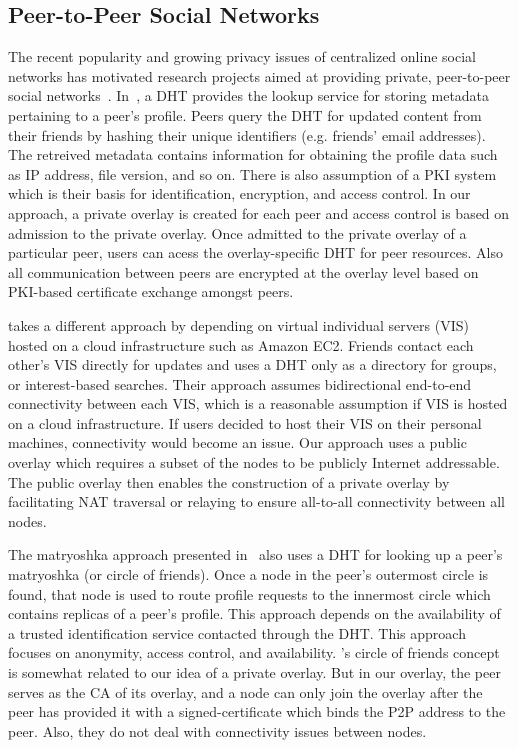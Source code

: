 \documentclass[letterpaper,twocolumn,10pt]{article}
\begin{document}
\subsection{Peer-to-Peer Social Networks}
The recent popularity and growing privacy issues of centralized online social networks 
has motivated research projects aimed at providing private, peer-to-peer
social networks~\cite{peerson, matryoshkas, tribler-osn, vis-a-vis}.
In~\cite{peerson}, a DHT provides the lookup service for storing metadata 
pertaining to a peer's profile. Peers query the DHT for updated content from 
their friends by hashing their unique identifiers (e.g. friends' email addresses). 
The retreived metadata contains information for obtaining the profile data such as
IP address, file version, and so on. There is also assumption of a PKI system which
is their basis for identification, encryption, and access control. In our
approach, a private overlay is created for each peer and access control is
based on admission to the private overlay. Once admitted to the private
overlay of a particular peer, users can acess the overlay-specific DHT for 
peer resources. Also all communication between peers are encrypted at the
overlay level based on PKI-based certificate exchange amongst peers.

\cite{vis-a-vis} takes a different approach by depending on virtual individual
servers (VIS) hosted on a cloud infrastructure such as Amazon EC2. Friends contact
each other's VIS directly for updates and uses a DHT only as a directory for
groups, or interest-based searches. Their approach assumes bidirectional
end-to-end connectivity between each VIS, which is a reasonable assumption if VIS 
is hosted on a cloud infrastructure. If users decided to host their VIS on their personal
machines, connectivity would become an issue. Our approach uses a public overlay
which requires a subset of the nodes to be publicly Internet addressable. The
public overlay then enables the construction of a private overlay by facilitating
NAT traversal or relaying to ensure all-to-all connectivity between all nodes.

The matryoshka approach presented in~\cite{matryoshka} also uses a DHT for
looking up a peer's matryoshka (or circle of friends). Once a node in the 
peer's outermost circle is found, that node is used to route profile requests to 
the innermost circle which contains replicas of a peer's profile. This
approach depends on the availability of a trusted identification service
contacted through the DHT. This approach focuses on anonymity, access control,
and availability. \cite{matryoshka}'s circle of friends concept
is somewhat related to our idea of a private overlay. But in our overlay,
the peer serves as the CA of its overlay, and a node can only join the
overlay after the peer has provided it with a signed-certificate which binds
the P2P address to the peer. Also, they do not deal with connectivity issues
between nodes.
\end{document}
